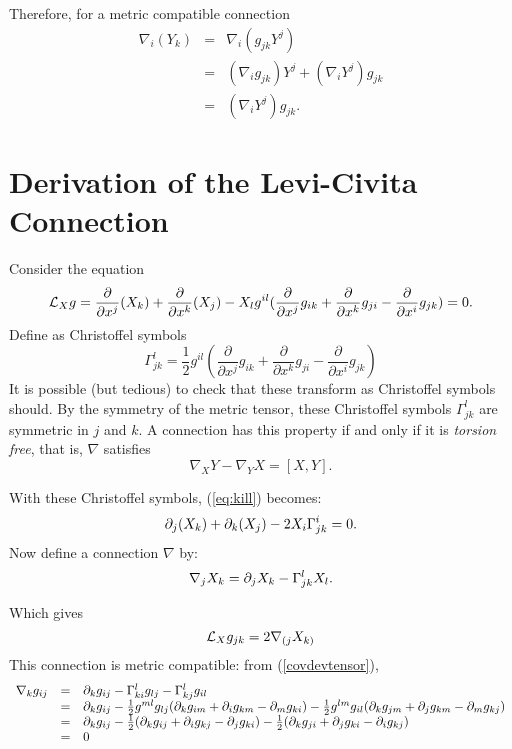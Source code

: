Therefore, for a metric compatible connection
\begin{eqnarray*}
 \nabla_i (Y_k)&=&\nabla_i (g_{jk}Y^j)\\
 &=&(\nabla_i g_{jk})Y^j + (\nabla_i Y^j)g_{jk}\\
 &=&(\nabla_i Y^j)g_{jk}. \end{eqnarray*}

\section{Derivation of the Levi-Civita Connection}

Consider the equation 
\begin{equation}
{\mathcal{L}}_X g= \frac{\partial}{\partial x^j}(X_k) + \frac{\partial}{\partial x^k}(X_j) - X_l g^{il}(\frac{\partial}{\partial x^j}g_{ik}+\frac{\partial}{\partial x^k}g_{ji}-\frac{\partial}{\partial x^i}g_{jk})=0.
\label{eq:kill}
\end{equation}
Define as Christoffel symbols
\begin{equation} 
\Gamma^l_{jk}=\frac{1}{2}g^{il}( \frac{\partial}{\partial x^j}g_{ik}+\frac{\partial}{\partial x^k}g_{ji}-\frac{\partial}{\partial x^i}g_{jk}) 
\label{eq:Christoffel}\end{equation}
It is possible (but tedious) to check that these transform as Christoffel symbols should. By the symmetry of the metric tensor, these Christoffel symbols $\Gamma^l_{jk}$ are symmetric in $j$ and $k$. A connection has this property if and only if it is \textit{torsion free}, that is, $\nabla$ satisfies
\begin{equation} \nabla_X Y - \nabla_Y X=[X,Y]. \label{eq:torsionfree} \end{equation}

With these Christoffel symbols, (\ref{eq:kill}) becomes:
\begin{equation} 
{\partial}_j(X_k) + {\partial}_k(X_j) - 2X_i \Gamma^i_{jk}=0.
\label{eq:Killingg}\end{equation}
Now define a connection $\nabla$ by:
\begin{equation} \nabla_j X_k = {\partial}_j X_k - \Gamma^l_{jk}X_l. \label{eq:nablaX} \end{equation}

Which gives 
\begin{equation}
{\mathcal{L}}_X g_{jk}=2 \nabla_{(j}X_{k)}
\label{eq:LieCon}
\end{equation}
This connection is metric compatible: from (\ref{covdevtensor}),
\begin{equation}\begin{array}{lcl}
\nabla_k g_{ij} &=& {\partial}_k g_{ij} - \Gamma^l_{ki}g_{lj} - \Gamma^l_{kj}g_{il} \\
&=& {\partial}_k g_{ij}-\frac{1}{2}g^{ml}g_{lj}({\partial}_k g_{im}+{\partial}_i g_{km}-{\partial}_m g_{ki})-\frac{1}{2}g^{lm}g_{il}( {\partial}_k g_{jm}+{\partial}_j g_{km}-{\partial}_m g_{kj})\\
&=& {\partial}_k g_{ij}-\frac{1}{2}( {\partial}_k g_{ij}+{\partial}_i g_{kj}-{\partial}_j g_{ki})-\frac{1}{2}( {\partial}_k g_{ji}+{\partial}_j g_{ki}-{\partial}_i g_{kj})\\
&=& 0
\end{array}
\end{equation}


